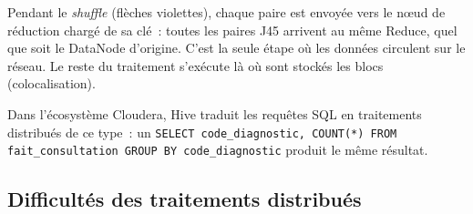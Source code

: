 \begin{center}
\end{center}

\noindent Pendant le \textit{shuffle} (flèches violettes), chaque paire est envoyée vers le nœud de réduction chargé de sa clé~: toutes les paires J45 arrivent au même Reduce, quel que soit le DataNode d'origine. C'est la seule étape où les données circulent sur le réseau. Le reste du traitement s'exécute là où sont stockés les blocs (colocalisation).

\noindent Dans l'écosystème Cloudera, Hive traduit les requêtes SQL en traitements distribués de ce type~: un \texttt{SELECT code\_diagnostic, COUNT(*) FROM fait\_consultation GROUP BY code\_diagnostic} produit le même résultat.

\subsection{Difficultés des traitements distribués}

